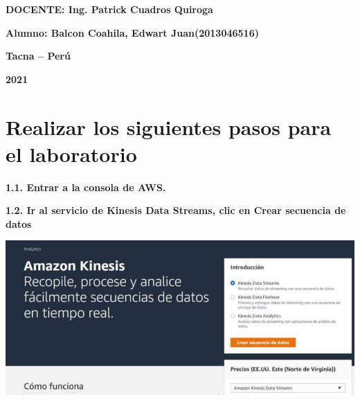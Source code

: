 \documentclass{article}
\begin{document}
\begin{titlepage}
\begin{center}
\vspace*{0.3in}
\begin{Large}
\textbf{DOCENTE: Ing. Patrick Cuadros Quiroga} \\
\end{Large}

\vspace*{0.2in}
\vspace*{0.1in}
\begin{large}

\begin{Large}
\textbf{Alumno: Balcon Coahila, Edwart Juan\hfill	(2013046516) } \\
\end{Large}

\vspace*{0.15in}
\begin{Large}
\textbf{Tacna – Perú} \\
\end{Large}

\vspace*{0.05in}
\begin{Large}
\textbf{2021 } \\
\end{Large}

\end{large}
\end{center}

\end{titlepage}


\newpage

\section{ Realizar los siguientes pasos para el laboratorio }

\textbf{1.1.  Entrar a la consola de AWS.}

    
\textbf{1.2.  Ir al servicio de Kinesis Data Streams, clic en Crear secuencia de datos}

\begin{center}
		\includegraphics[width=15cm]{./images/1} 
	\end{center}
	
\end{document}
